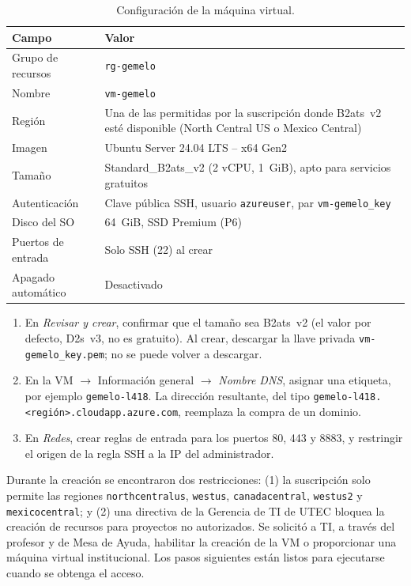 \documentclass[11pt,a4paper]{article}
\newcommand{\arch}[1]{\texttt{#1}}
\begin{document}
\begin{table}[H]
\centering
\caption{Configuraci\'on de la m\'aquina virtual.}
\begin{tabularx}{\textwidth}{@{}lX@{}}
\toprule
\textbf{Campo} & \textbf{Valor} \\
\midrule
Grupo de recursos & \texttt{rg-gemelo} \\
Nombre & \texttt{vm-gemelo} \\
Regi\'on & Una de las permitidas por la suscripci\'on donde B2ats~v2 est\'e disponible
(North Central US o Mexico Central) \\
Imagen & Ubuntu Server 24.04 LTS -- x64 Gen2 \\
Tama\~no & Standard\_B2ats\_v2 (2 vCPU, 1~GiB), apto para servicios gratuitos \\
Autenticaci\'on & Clave p\'ublica SSH, usuario \texttt{azureuser}, par \texttt{vm-gemelo\_key} \\
Disco del SO & 64~GiB, SSD Premium (P6) \\
Puertos de entrada & Solo SSH (22) al crear \\
Apagado autom\'atico & Desactivado \\
\bottomrule
\end{tabularx}
\end{table}

\begin{enumerate}[resume]
  \item En \emph{Revisar y crear}, confirmar que el tama\~no sea B2ats~v2 (el valor por
        defecto, D2s~v3, no es gratuito). Al crear, descargar la llave privada
        \arch{vm-gemelo\_key.pem}; no se puede volver a descargar.
  \item En la VM $\rightarrow$ Informaci\'on general $\rightarrow$ \emph{Nombre DNS},
        asignar una etiqueta, por ejemplo \texttt{gemelo-l418}. La direcci\'on resultante,
        del tipo \texttt{gemelo-l418.<regi\'on>.cloudapp.azure.com}, reemplaza la compra de
        un dominio.
  \item En \emph{Redes}, crear reglas de entrada para los puertos 80, 443 y 8883, y
        restringir el origen de la regla SSH a la IP del administrador.
\end{enumerate}

\begin{nota}
Durante la creaci\'on se encontraron dos restricciones: (1) la suscripci\'on solo permite las
regiones \texttt{northcentralus}, \texttt{westus}, \texttt{canadacentral}, \texttt{westus2} y
\texttt{mexicocentral}; y (2) una directiva de la Gerencia de TI de UTEC bloquea la creaci\'on
de recursos para proyectos no autorizados. Se solicit\'o a TI, a trav\'es del profesor y de
Mesa de Ayuda, habilitar la creaci\'on de la VM o proporcionar una m\'aquina virtual
institucional. Los pasos siguientes est\'an listos para ejecutarse cuando se obtenga el
acceso.
\end{nota}
\end{document}
